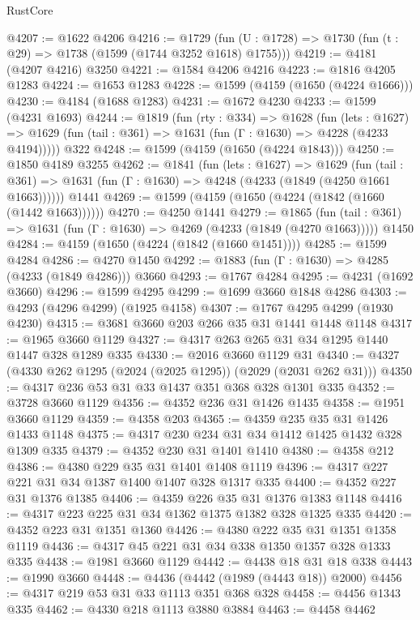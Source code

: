 \begin{lexlean}{RustCore}
\begin{coremodule}
@4207 := @1622 @4206
@4216 := @1729 (fun (U : @1728) => @1730 (fun (t : @29) => @1738 (@1599 (@1744 @3252 @1618) @1755)))
@4219 := @4181 (@4207 @4216) @3250
@4221 := @1584 @4206 @4216
@4223 := @1816 @4205 @1283
@4224 := @1653 @1283
@4228 := @1599 (@4159 (@1650 (@4224 @1666)))
@4230 := @4184 (@1688 @1283)
@4231 := @1672 @4230
@4233 := @1599 (@4231 @1693)
@4244 := @1819
    (fun (rty : @334) =>
    @1628
      (fun (lets : @1627) =>
      @1629 (fun (tail : @361) => @1631 (fun (Γ : @1630) => @4228 (@4233 @4194)))))
    @322
@4248 := @1599 (@4159 (@1650 (@4224 @1843)))
@4250 := @1850 @4189 @3255
@4262 := @1841
    (fun (lets : @1627) =>
    @1629
      (fun (tail : @361) => @1631 (fun (Γ : @1630) => @4248 (@4233 (@1849 (@4250 @1661 @1663))))))
    @1441
@4269 := @1599 (@4159 (@1650 (@4224 (@1842 (@1660 (@1442 @1663))))))
@4270 := @4250 @1441
@4279 := @1865
    (fun (tail : @361) => @1631 (fun (Γ : @1630) => @4269 (@4233 (@1849 (@4270 @1663)))))
    @1450
@4284 := @4159 (@1650 (@4224 (@1842 (@1660 @1451))))
@4285 := @1599 @4284
@4286 := @4270 @1450
@4292 := @1883 (fun (Γ : @1630) => @4285 (@4233 (@1849 @4286))) @3660
@4293 := @1767 @4284
@4295 := @4231 (@1692 @3660)
@4296 := @1599 @4295
@4299 := @1699 @3660 @1848 @4286
@4303 := @4293 (@4296 @4299) (@1925 @4158)
@4307 := @1767 @4295 @4299 (@1930 @4230)
@4315 := @3681 @3660 @203 @266 @35 @31 @1441 @1448 @1148
@4317 := @1965 @3660 @1129
@4327 := @4317 @263 @265 @31 @34 @1295 @1440 @1447 @328 @1289 @335
@4330 := @2016 @3660 @1129 @31
@4340 := @4327 (@4330 @262 @1295 (@2024 (@2025 @1295)) (@2029 (@2031 @262 @31)))
@4350 := @4317 @236 @53 @31 @33 @1437 @351 @368 @328 @1301 @335
@4352 := @3728 @3660 @1129
@4356 := @4352 @236 @31 @1426 @1435
@4358 := @1951 @3660 @1129
@4359 := @4358 @203
@4365 := @4359 @235 @35 @31 @1426 @1433 @1148
@4375 := @4317 @230 @234 @31 @34 @1412 @1425 @1432 @328 @1309 @335
@4379 := @4352 @230 @31 @1401 @1410
@4380 := @4358 @212
@4386 := @4380 @229 @35 @31 @1401 @1408 @1119
@4396 := @4317 @227 @221 @31 @34 @1387 @1400 @1407 @328 @1317 @335
@4400 := @4352 @227 @31 @1376 @1385
@4406 := @4359 @226 @35 @31 @1376 @1383 @1148
@4416 := @4317 @223 @225 @31 @34 @1362 @1375 @1382 @328 @1325 @335
@4420 := @4352 @223 @31 @1351 @1360
@4426 := @4380 @222 @35 @31 @1351 @1358 @1119
@4436 := @4317 @45 @221 @31 @34 @338 @1350 @1357 @328 @1333 @335
@4438 := @1981 @3660 @1129
@4442 := @4438 @18 @31 @18 @338
@4443 := @1990 @3660
@4448 := @4436 (@4442 (@1989 (@4443 @18)) @2000)
@4456 := @4317 @219 @53 @31 @33 @1113 @351 @368 @328
@4458 := @4456 @1343 @335
@4462 := @4330 @218 @1113 @3880 @3884
@4463 := @4458 @4462

\end{coremodule}
\end{lexlean}
